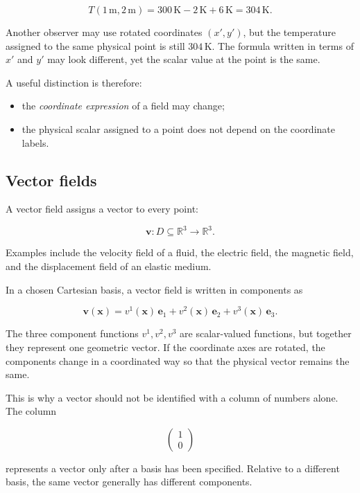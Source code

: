 \[
T(1\,\mathrm{m},2\,\mathrm{m})
=
300\,\mathrm{K}-2\,\mathrm{K}+6\,\mathrm{K}
=
304\,\mathrm{K}.
\]

Another observer may use rotated coordinates \((x',y')\), but the temperature assigned to the same physical point is still \(304\,\mathrm{K}\). The formula written in terms of \(x'\) and \(y'\) may look different, yet the scalar value at the point is the same.

A useful distinction is therefore:

\begin{itemize}
    \item the \emph{coordinate expression} of a field may change;
    \item the physical scalar assigned to a point does not depend on the coordinate labels.
\end{itemize}

\subsection{Vector fields}

A vector field assigns a vector to every point:

\[
\mathbf{v}:D\subseteq\mathbb{R}^{3}\longrightarrow\mathbb{R}^{3}.
\]

Examples include the velocity field of a fluid, the electric field, the magnetic field, and the displacement field of an elastic medium.

In a chosen Cartesian basis, a vector field is written in components as

\[
\mathbf{v}(\mathbf{x})
=
v^{1}(\mathbf{x})\,\mathbf{e}_{1}
+
v^{2}(\mathbf{x})\,\mathbf{e}_{2}
+
v^{3}(\mathbf{x})\,\mathbf{e}_{3}.
\]

The three component functions \(v^{1},v^{2},v^{3}\) are scalar-valued functions, but together they represent one geometric vector. If the coordinate axes are rotated, the components change in a coordinated way so that the physical vector remains the same.

This is why a vector should not be identified with a column of numbers alone. The column

\[
\begin{pmatrix}
1\\
0
\end{pmatrix}
\]

represents a vector only after a basis has been specified. Relative to a different basis, the same vector generally has different components.

